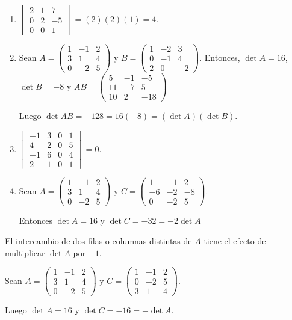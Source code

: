 \begin{ejem}
\begin{enumerate}
    \item $\begin{vmatrix} 2 & 1 & 7 \\ 0 & 2 & -5 \\ 0 & 0 & 1 \end{vmatrix} = (2)(2)(1) = 4$.
    \item Sean $A = \begin{pmatrix} 1 & -1 & 2 \\ 3 & 1 & 4 \\ 0 & -2 & 5 \end{pmatrix}$ y $B = \begin{pmatrix} 1 & -2 & 3 \\ 0 & -1 & 4 \\ 2 & 0 & -2 \end{pmatrix}$. Entonces, $\det A = 16$, $\det B = -8$ y $AB = \begin{pmatrix} 5 & -1 & -5 \\ 11 & -7 & 5 \\ 10 & 2 & -18 \end{pmatrix}$

Luego $\det AB = -128 = 16(-8) = (\det A) (\det B)$.

    \item $\begin{vmatrix} -1 & 3 & 0 & 1 \\ 4 & 2 & 0 & 5 \\ -1 & 6 & 0 & 4 \\ 2 & 1 & 0 & 1 \end{vmatrix} = 0$.
    \item Sean $A = \begin{pmatrix} 1 & -1 & 2 \\ 3 & 1 & 4 \\ 0 & -2 & 5 \end{pmatrix}$ y $C = \begin{pmatrix} 1 & -1 & 2 \\ -6 & -2 & -8 \\ 0 & -2 & 5 \end{pmatrix}$. 

Entonces $\det A = 16$ y $\det C = -32 = -2 \det A$
\end{enumerate}
\end{ejem}

\begin{rmk}
El intercambio de dos filas o columnas distintas de $A$ tiene el efecto de multiplicar $\det A$ por $-1$.
\end{rmk}
\begin{ejem}
Sean $A = \begin{pmatrix} 1 & -1 & 2 \\ 3 & 1 & 4 \\ 0 & -2 & 5 \end{pmatrix}$ y $C = \begin{pmatrix} 1 & -1 & 2 \\ 0 & -2 & 5 \\ 3 & 1 & 4 \end{pmatrix}$. 

Luego $\det A = 16$ y $\det C = -16 = - \det A$.
\end{ejem}

